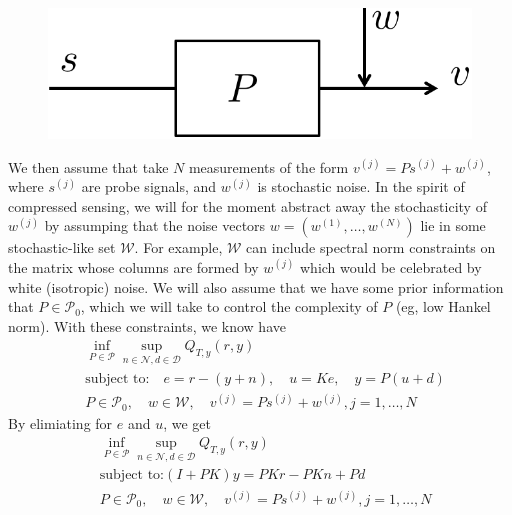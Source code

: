 \documentclass[11pt]{article} %
\newcommand{\calW}{\mathcal{W}}
\newcommand{\calD}{\mathcal{D}}
\newcommand{\calN}{\mathcal{N}}
\newcommand{\calP}{\mathcal{P}}
\theoremstyle{plain}
\theoremstyle{definition}
\theoremstyle{remark}
\begin{document}
\begin{figure}[h!]
  \centering
  \includegraphics[width=.3\linewidth]{sys3.pdf}
\end{figure}

We then assume that take $N$ measurements of the form $v^{(j)} = Ps^{(j)} + w^{(j)}$, where $s^{(j)}$ are probe signals, and $w^{(j)}$ is stochastic noise. In the spirit of compressed sensing, we will for the moment abstract away the stochasticity of $w^{(j)}$ by assumping that the noise vectors $w = (w^{(1)},\dots,w^{(N)})$ lie in some stochastic-like set $\calW$. For example, $\calW$ can include spectral norm constraints on the matrix whose columns are formed by $w^{(j)}$ which would be celebrated by white (isotropic) noise. We will also assume that we have some prior information that $P \in \calP_0$, which we will take to control the complexity of $P$ (eg, low Hankel norm). With these constraints, we know have
\begin{equation}\label{OPT2}
\begin{aligned}
&\inf_{P \in \calP} \sup_{n \in \calN,d \in \calD} Q_{T,y}(r,y)  \\
&\text{subject to:} \quad e = r - (y+n), \quad u = Ke,\quad  y = P(u+d)\\
& P \in \calP_0, \quad w \in \calW, \quad v^{(j)} = Ps^{(j)} + w^{(j)}, j = 1,\dots,N
\end{aligned}
\end{equation}
By elimiating for $e$ and $u$, we get
\begin{equation}\label{OPT3}
\begin{aligned}
&\inf_{P \in \calP} \sup_{n \in \calN,d \in \calD} Q_{T,y}(r,y)  \\
&\text{subject to:}   (I+PK)y = PKr - PKn + Pd\\
& P \in \calP_0, \quad w \in \calW, \quad v^{(j)} = Ps^{(j)} + w^{(j)}, j = 1,\dots,N
\end{aligned}
\end{equation}
\end{document}
